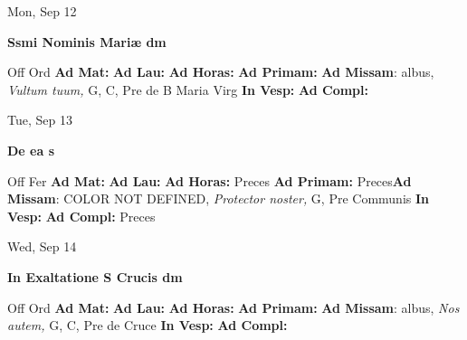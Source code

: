 \documentclass[10pt]{memoir}
\begin{document}
\begin{center}
\begin{minipage}{3.5in}
\vspace{2em}
\begin{center}Mon, Sep 12
\end{center}
\textbf{ \large Ssmi Nominis Mariæ
\textnormal{\normalsize dm}}

\begin{justify}Off Ord
\textbf{Ad Mat: }
\textbf{Ad Lau: }
\textbf{Ad Horas: }
\textbf{Ad Primam: }\textbf{Ad Missam}: albus, \textit{Vultum tuum,} G, C, Pre de B Maria Virg
\textbf{In Vesp: }
\textbf{Ad Compl: }
\end{justify}
\end{minipage}
\end{center}

\begin{center}
\begin{minipage}{3.5in}
\vspace{2em}
\begin{center}Tue, Sep 13
\end{center}
\textbf{ \large De ea
\textnormal{\normalsize s}}

\begin{justify}Off Fer
\textbf{Ad Mat: }
\textbf{Ad Lau: }
\textbf{Ad Horas: }Preces
\textbf{Ad Primam: }Preces\textbf{Ad Missam}: COLOR NOT DEFINED, \textit{Protector noster,} G, Pre Communis
\textbf{In Vesp: }
\textbf{Ad Compl: }Preces
\end{justify}
\end{minipage}
\end{center}

\begin{center}
\begin{minipage}{3.5in}
\vspace{2em}
\begin{center}Wed, Sep 14
\end{center}
\textbf{ \large In Exaltatione S Crucis
\textnormal{\normalsize dm}}

\begin{justify}Off Ord
\textbf{Ad Mat: }
\textbf{Ad Lau: }
\textbf{Ad Horas: }
\textbf{Ad Primam: }\textbf{Ad Missam}: albus, \textit{Nos autem,} G, C, Pre de Cruce
\textbf{In Vesp: }
\textbf{Ad Compl: }
\end{justify}
\end{minipage}
\end{center}
\end{document}
